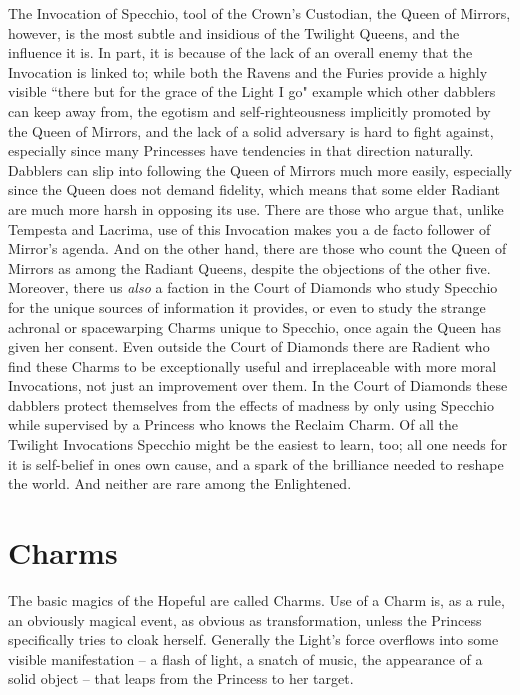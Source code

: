 {The Invocation of Specchio, tool of the Crown's Custodian, the Queen of Mirrors, however, is the most subtle and insidious of the Twilight Queens, and the influence it is. In part, it is because of the lack of an overall enemy that the Invocation is linked to; while both the Ravens and the Furies provide a highly visible \textquotedblleft there but for the grace of the Light I go" example which other dabblers can keep away from, the egotism and self-righteousness implicitly promoted by the Queen of Mirrors, and the lack of a solid adversary is hard to fight against, especially since many Princesses have tendencies in that direction naturally. Dabblers can slip into following the Queen of Mirrors much more easily, especially since the Queen does not demand fidelity, which means that some elder Radiant are much more harsh in opposing its use. There are those who argue that, unlike Tempesta and Lacrima, use of this Invocation makes you a de facto follower of Mirror's agenda. And on the other hand, there are 
those who count the Queen of Mirrors as among the Radiant Queens, despite the objections of the other five. Moreover, there us \textit{also} a faction in the Court of Diamonds who study Specchio for the unique sources of information it provides, or even to study the strange achronal or spacewarping Charms unique to Specchio, once again the Queen has given her consent. Even outside the Court of Diamonds there are Radient who find these Charms to be exceptionally useful and irreplaceable with more moral Invocations, not just an improvement over them. In the Court of Diamonds these dabblers protect themselves from the effects of madness by only using Specchio while supervised by a Princess who knows the Reclaim Charm. Of all the Twilight Invocations Specchio might be the easiest to learn, too; all one needs for it is self-belief in ones own cause, and a spark of the brilliance needed to reshape the world. And neither are rare among the Enlightened. 

}



\section*{Charms}
The basic magics of the Hopeful are called Charms. Use of a Charm is, as a rule, an obviously magical event, as obvious as transformation, unless the Princess specifically tries to cloak herself. Generally the Light's force overflows into some visible manifestation -- a flash of light, a snatch of music, the appearance of a solid object -- that leaps from the Princess to her target.

